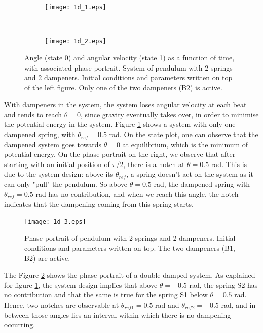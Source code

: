 \documentclass{cmc}
\begin{document}
\begin{figure}[H]
    \centering
    \begin{subfigure}[b]{0.5\textwidth}
        \centering
        \texttt{[image: 1d\_1.eps]}
    \end{subfigure}%
    ~
    \begin{subfigure}[b]{0.5\textwidth}
        \centering
        \texttt{[image: 1d\_2.eps]}
    \end{subfigure}
    \caption{Angle (state 0) and angular velocity (state 1) as a function of time, with associated phase portrait. System of pendulum with 2 springs and 2 dampeners. Initial conditions and parameters written on top of the left figure. Only one of the two dampeners (B2) is active.}
    \label{figure:1d}
\end{figure}

With dampeners in the system, the system loses angular velocity at each beat and tends to reach $\theta=0$, since gravity eventually takes over, in order to minimise the potential energy in the system. Figure \ref{figure:1d} shows a system with only one dampened spring, with $\theta_{ref} = 0.5$ rad. On the state plot, one can observe that the dampened system goes towards $\theta=0$ at equilibrium, which is the minimum of potential energy. On the phase portrait on the right, we observe that after starting with an initial position of $\pi/2$, there is a notch at $\theta=0.5$  rad. This is due to the system design: above its $\theta_{ref}$, a spring doesn't act on the system as it can only "pull" the pendulum. So above $\theta=0.5$ rad, the dampened spring with $\theta_{ref} = 0.5$ rad has no contribution, and when we reach this angle, the notch indicates that the dampening coming from this spring starts.

\begin{figure}[H]
	\centering
	\texttt{[image: 1d\_3.eps]}
    \caption{Phase portrait of pendulum with 2 springs and 2 dampeners. Initial conditions and parameters written on top. The two dampeners (B1, B2) are active.}
	\label{figure:1d3}
\end{figure}

The Figure \ref{figure:1d3} shows the phase portrait of a double-damped system. As explained for figure \ref{figure:1d}, the system design implies that above $\theta = -0.5$ rad, the spring S2 has no contribution and that the same is true for the spring S1 below $\theta = 0.5$ rad. Hence, two notches are observable at $\theta_{ref1} = 0.5$ rad and $\theta_{ref2} = -0.5$ rad, and in-between those angles lies an interval within which there is no dampening occurring.
\end{document}
